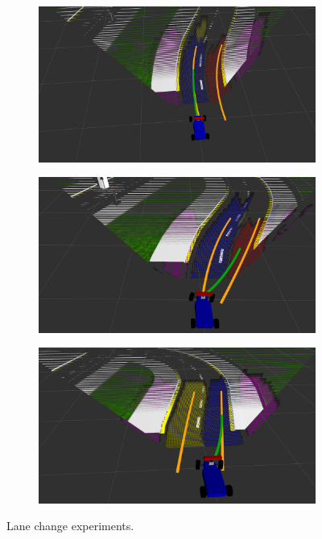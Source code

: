 \begin{figure}[h]
\begin{subfigure}[b]{0.45\linewidth}
  \end{subfigure}
  \begin{subfigure}[b]{0.45\linewidth}
      \includegraphics[width=\linewidth]{figures/experiments/overtaking2-pc.png}
  \end{subfigure}
  \begin{subfigure}[b]{0.45\linewidth}
      \includegraphics[width=\linewidth]{figures/experiments/overtaking3-pc.png}
  \end{subfigure}
  \begin{subfigure}[b]{0.45\linewidth}
      \includegraphics[width=\linewidth]{figures/experiments/overtaking4-pc.png}
  \end{subfigure}
  \caption{Lane change experiments.}
  \label{figure:lane-change}
\end{figure}

